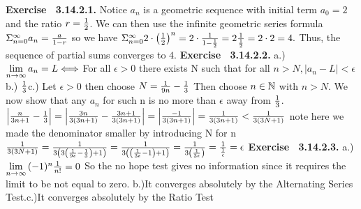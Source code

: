  {\noindent \protect \bf  Exercise ~3.14.2.1.} Notice $a_n$ is a geometric sequence with initial term $a_0=2$ and the ratio $r=\protect \frac  {1}{2}$. We can then use the infinite geometric series formula $\Sigma _{n=0}^\infty {a_n}= \protect \frac  {a}{1-r}$ so we have $\Sigma _{n=0}^\infty {2\cdot \left (\protect \frac  {1}{2}\right )^n} = 2 \cdot \protect \frac  {1}{1-\protect \frac  {1}{2}} = 2 \protect \frac  {1}{\protect \frac  {1}{2}} = 2 \cdot 2 = 4.$ Thus, the sequence of partial sums converges to $4$. \protect \newline  \protect \newline  
 {\noindent \protect \bf  Exercise ~3.14.2.2.} a.) $\protect \qopname  \relax m{lim}\limits _{n \to \infty }{a_n} = L \DOTSB \Leftarrow \protect \joinrel  \Rightarrow $ For all $\epsilon >0$ there exists N such that for all $n>N, |a_n-L| < \epsilon $ \protect \newline  b.) $\protect \frac  {1}{3}$\protect \newline  c.) Let $\epsilon >0$ then choose $N=\protect \frac  {1}{9n}-\protect \frac  {1}{3}$ Then choose $n \in \protect \mathbb  {N}$ with $n>N$. We now show that any $a_n$ for such n is no more than $\epsilon $ away from $\protect \frac  {1}{3}$. \protect \newline  $\left | \protect \frac  {n}{3n+1} - \protect \frac  {1}{3} \right |=\left | \protect \frac  {3n}{3(3n+1)} - \protect \frac  {3n+1}{3(3n+1)} \right |=\left | \protect \frac  {-1}{3(3n+1)} \right |= \protect \frac  {1}{3(3n+1)}<\protect \frac  {1}{3(3N+1)}$ \protect \newline  note here we made the denominator smaller by introducing N for n\protect \newline  $\protect \frac  {1}{3(3N+1)}=\protect \frac  {1}{3\left (3\left (\protect \frac  {1}{9 \epsilon }-\protect \frac  {1}{3} \right )+1\right )}=\protect \frac  {1}{3\left (\left (\protect \frac  {1}{3 \epsilon }-1 \right )+1\right )}=\protect \frac  {1}{3\left (\protect \frac  {1}{3 \epsilon } \right )}=\protect \frac  {1}{\protect \frac  {1}{\epsilon }}=\epsilon $  \protect \newline  \protect \newline  
 {\noindent \protect \bf  Exercise ~3.14.2.3.} a.)$\protect \qopname  \relax m{lim}\limits _{n \to \infty }{(-1)^n \protect \frac  {1}{n!}} = 0$ So the no hope test gives no information since it requires the limit to be not equal to zero. \protect \newline  b.)It converges absolutely by the Alternating Series Test.\protect \newline  c.)It converges absolutely by the Ratio Test  \protect \newline  \protect \newline  
